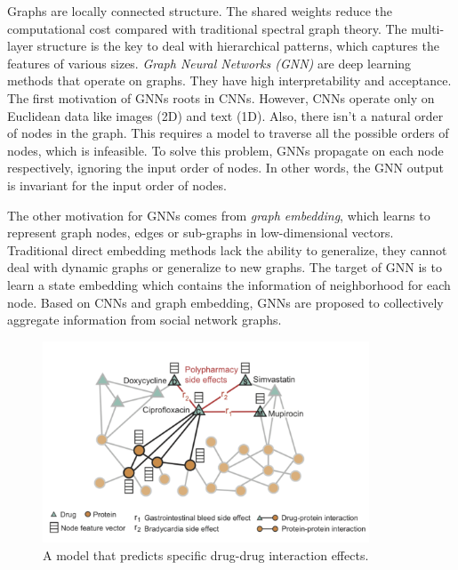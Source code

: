 Graphs are locally connected structure. The shared weights reduce the computational cost compared with traditional spectral graph theory. The multi-layer structure is the key to deal with hierarchical patterns, which captures the features of various sizes. \textit{Graph Neural Networks (GNN)} are deep learning methods that operate on graphs. They have high interpretability and acceptance. The first motivation of GNNs roots in CNNs.  However, CNNs operate only on Euclidean data like images (2D) and text (1D). Also, there isn't a natural order of nodes in the graph. This requires a model to traverse all the possible orders of nodes, which is infeasible. To solve this problem, GNNs propagate on each node respectively, ignoring the
input order of nodes. In other words, the GNN output is invariant for the input order of nodes. 

The other motivation for GNNs comes from \textit{graph embedding}, which learns to represent graph nodes, edges or sub-graphs in low-dimensional vectors. Traditional direct embedding methods lack the ability to generalize, they cannot deal with dynamic graphs or generalize to new graphs.  The target of GNN is to learn a state embedding which contains the information of neighborhood for each node. Based on CNNs and graph embedding, GNNs are proposed to collectively aggregate information from social network graphs.

\begin{figure}
    \centering
    \includegraphics[height=6cm]{tex/img/drug-protein interaction.png}
    \caption{A model that predicts specific drug-drug interaction effects.}
    \label{fig:my_label}
\end{figure}
